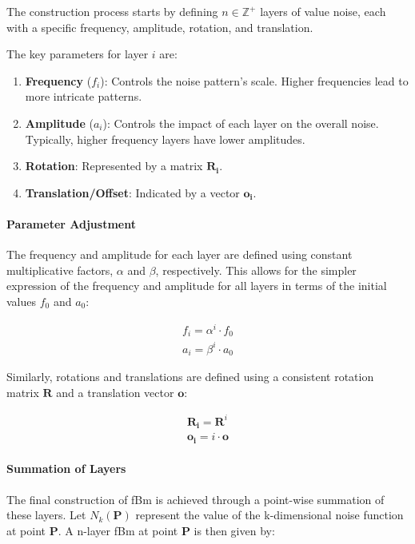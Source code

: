 The construction process starts by defining $n \in \mathbb{Z}^+$ layers of value noise, each with a specific frequency, amplitude, rotation, and translation. 

The key parameters for layer $i$ are:

\begin{enumerate}
    \item \textbf{Frequency} ($f_i$): Controls the noise pattern's scale. Higher frequencies lead to more intricate patterns.
    \item \textbf{Amplitude} ($a_i$): Controls the impact of each layer on the overall noise. Typically, higher frequency layers have lower amplitudes.
    \item \textbf{Rotation}: Represented by a matrix $\mathbf{R_i}$.
    \item \textbf{Translation/Offset}: Indicated by a vector $\mathbf{o_i}$.
\end{enumerate}

\paragraph{Parameter Adjustment}

The frequency and amplitude for each layer are defined using constant multiplicative factors, $\alpha$ and $\beta$, respectively. This allows for the simpler expression of the frequency and amplitude for all layers in terms of the initial values $f_0$ and $a_0$:

\begin{align}
f_i = \alpha^i \cdot f_0 \\
a_i = \beta^i \cdot a_0
\end{align}

Similarly, rotations and translations are defined using a consistent rotation matrix $\mathbf{R}$ and a translation vector $\mathbf{o}$:

\begin{align}
\mathbf{R_i} = \mathbf{R}^i \\
\mathbf{o_i} = i\cdot\mathbf{o}
\end{align}

\paragraph{Summation of Layers}

The final construction of fBm is achieved through a point-wise summation of these layers. Let $N_k(\mathbf{P})$ represent the value of the k-dimensional noise function at point $\mathbf{P}$. A n-layer fBm at point $\mathbf{P}$ is then given by:

